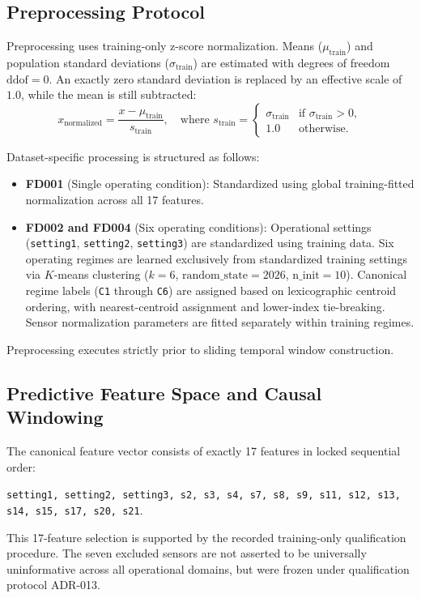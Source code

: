
\subsection*{Preprocessing Protocol}
Preprocessing uses training-only z-score normalization. Means ($\mu_{\text{train}}$) and population standard deviations ($\sigma_{\text{train}}$) are estimated with degrees of freedom $\text{ddof}=0$. An exactly zero standard deviation is replaced by an effective scale of $1.0$, while the mean is still subtracted:
\begin{equation}
x_{\text{normalized}} = \frac{x - \mu_{\text{train}}}{s_{\text{train}}}, \quad \text{where } s_{\text{train}} = \begin{cases} \sigma_{\text{train}} & \text{if } \sigma_{\text{train}} > 0, \\ 1.0 & \text{otherwise.} \end{cases}
\end{equation}

Dataset-specific processing is structured as follows:
\begin{itemize}
    \item \textbf{FD001} (Single operating condition): Standardized using global training-fitted normalization across all 17 features.
    \item \textbf{FD002 and FD004} (Six operating conditions): Operational settings (\texttt{setting1}, \texttt{setting2}, \texttt{setting3}) are standardized using training data. Six operating regimes are learned exclusively from standardized training settings via $K$-means clustering ($k=6$, $\text{random\_state}=2026$, $\text{n\_init}=10$). Canonical regime labels (\texttt{C1} through \texttt{C6}) are assigned based on lexicographic centroid ordering, with nearest-centroid assignment and lower-index tie-breaking. Sensor normalization parameters are fitted separately within training regimes.
\end{itemize}
Preprocessing executes strictly prior to sliding temporal window construction. 

\subsection*{Predictive Feature Space and Causal Windowing}
The canonical feature vector consists of exactly 17 features in locked sequential order:
\begin{center}
\texttt{setting1, setting2, setting3, s2, s3, s4, s7, s8, s9, s11, s12, s13, s14, s15, s17, s20, s21}.
\end{center}
This 17-feature selection is supported by the recorded training-only qualification procedure. The seven excluded sensors are not asserted to be universally uninformative across all operational domains, but were frozen under qualification protocol ADR-013.

